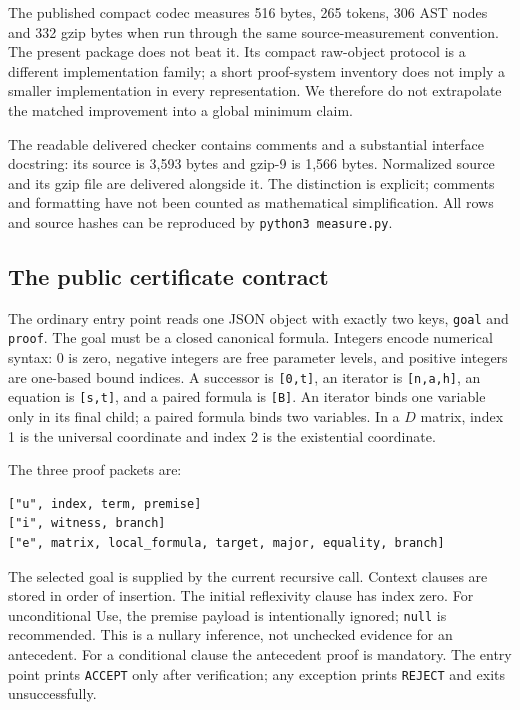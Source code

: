 \documentclass[11pt,letterpaper]{article}
\theoremstyle{definition}\newtheorem{definition}[theorem]{Definition}
\theoremstyle{remark}\newtheorem{remark}[theorem]{Remark}
\begin{document}
The published compact codec measures 516 bytes, 265 tokens, 306 AST nodes
and 332 gzip bytes when run through the same source-measurement convention.
The present package does not beat it. Its compact raw-object protocol is a
different implementation family; a short proof-system inventory does not
imply a smaller implementation in every representation. We therefore do
not extrapolate the matched improvement into a global minimum claim.

The readable delivered checker contains comments and a substantial interface
docstring: its source is 3,593 bytes and gzip-9 is 1,566 bytes. Normalized
source and its gzip file are delivered alongside it. The distinction is
explicit; comments and formatting have not been counted as mathematical
simplification. All rows and source hashes can be reproduced by
\texttt{python3 measure.py}.

\subsection{The public certificate contract}

The ordinary entry point reads one JSON object with exactly two keys,
\texttt{goal} and \texttt{proof}. The goal must be a closed canonical
formula. Integers encode numerical syntax: $0$ is zero, negative integers
are free parameter levels, and positive integers are one-based bound
indices. A successor is \texttt{[0,t]}, an iterator is
\texttt{[n,a,h]}, an equation is \texttt{[s,t]}, and a paired formula is
\texttt{[B]}. An iterator binds one variable only in its final child;
a paired formula binds two variables. In a $D$ matrix, index 1 is the
universal coordinate and index 2 is the existential coordinate.

The three proof packets are:
\begin{lstlisting}
["u", index, term, premise]
["i", witness, branch]
["e", matrix, local_formula, target, major, equality, branch]
\end{lstlisting}
The selected goal is supplied by the current recursive call. Context clauses
are stored in order of insertion. The initial reflexivity clause has index
zero. For unconditional Use, the premise payload is intentionally ignored;
\texttt{null} is recommended. This is a nullary inference, not unchecked
evidence for an antecedent. For a conditional clause the antecedent proof is
mandatory. The entry point prints \texttt{ACCEPT} only after verification;
any exception prints \texttt{REJECT} and exits unsuccessfully.
\end{document}

